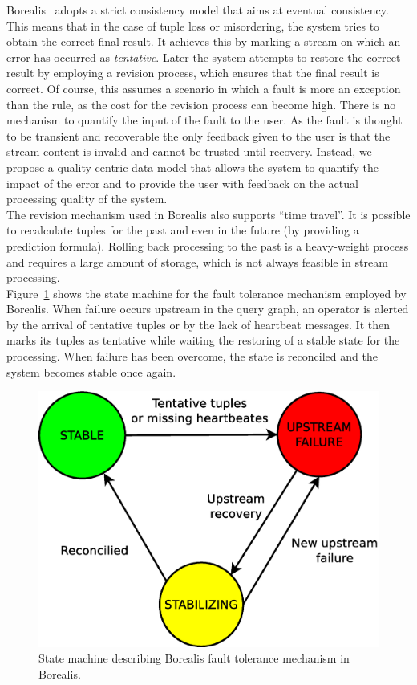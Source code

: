 Borealis~\cite{borealis-fault_tolerance} adopts a strict consistency model that aims at eventual
consistency. This means that in the case of tuple loss or misordering, the system tries to obtain
the correct final result. It achieves this by marking a stream on which an error has
occurred as \emph{tentative}.  Later the system attempts to restore the correct result by employing
a revision process, which ensures that the final result is correct.  Of course, this assumes a
scenario in which a fault is more an exception than the rule, as the cost for the revision process can
become high. There is no mechanism to quantify the input of the fault to the user. As the fault is
thought to be transient and recoverable the only feedback given to the user is that the stream content is
invalid and cannot be trusted until recovery. Instead, we propose a quality-centric data model that
allows the system to quantify the impact of the error and to provide the user with feedback on the
actual processing quality of the system.\\
The revision mechanism used in Borealis also supports ``time travel''.  It is possible to recalculate
tuples for the past and even in the future (by providing a prediction formula).
Rolling back processing to the past is a heavy-weight process and requires a large
amount of storage, which is not always feasible in stream processing.\\
Figure~\ref{fig:borealis-fault_tolerance} shows the state machine for the fault tolerance mechanism
employed by Borealis. When failure occurs upstream in the query graph, an operator is alerted by the
arrival of tentative tuples or by the lack of heartbeat messages.
It then marks its tuples as tentative while waiting the restoring of a stable
state for the processing. When failure has been overcome, the state is reconciled and the system
becomes stable once again.

\begin{figure}[t] 
	\centering
	\includegraphics[width=.4\textwidth]{img/tesi/borealis-fault_tolerance}
	\caption{State machine describing Borealis fault tolerance mechanism in Borealis. }
\label{fig:borealis-fault_tolerance}
\end{figure}

